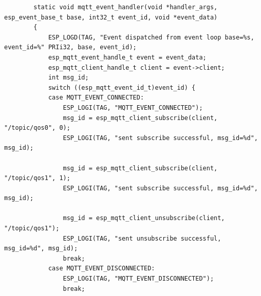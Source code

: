 \documentclass[12pt, a4paper]{article}
\begin{document}
    \begin{verbatim}
        static void mqtt_event_handler(void *handler_args, esp_event_base_t base, int32_t event_id, void *event_data)
        {
            ESP_LOGD(TAG, "Event dispatched from event loop base=%s, event_id=%" PRIi32, base, event_id);
            esp_mqtt_event_handle_t event = event_data;
            esp_mqtt_client_handle_t client = event->client;
            int msg_id;
            switch ((esp_mqtt_event_id_t)event_id) {
            case MQTT_EVENT_CONNECTED:
                ESP_LOGI(TAG, "MQTT_EVENT_CONNECTED");
                msg_id = esp_mqtt_client_subscribe(client, "/topic/qos0", 0);
                ESP_LOGI(TAG, "sent subscribe successful, msg_id=%d", msg_id);
        
                msg_id = esp_mqtt_client_subscribe(client, "/topic/qos1", 1);
                ESP_LOGI(TAG, "sent subscribe successful, msg_id=%d", msg_id);
        
                msg_id = esp_mqtt_client_unsubscribe(client, "/topic/qos1");
                ESP_LOGI(TAG, "sent unsubscribe successful, msg_id=%d", msg_id);
                break;
            case MQTT_EVENT_DISCONNECTED:
                ESP_LOGI(TAG, "MQTT_EVENT_DISCONNECTED");
                break;
        

\end{verbatim}
\end{document}
